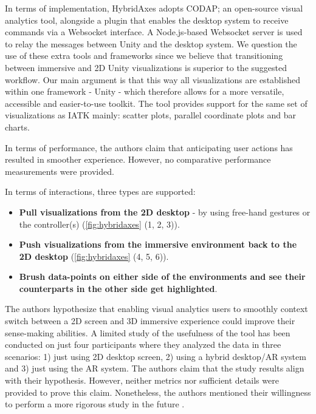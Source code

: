 \documentclass{vgtc}                          %
\begin{document}
\medskip

\noindent In terms of implementation, HybridAxes adopts CODAP; an open-source
\cite{codap} visual analytics tool, alongside a plugin
that enables the desktop system to receive commands via a Websocket interface.
A Node.js-based Websocket server is used to relay the messages between Unity
and the desktop system. We question the use of these extra tools and frameworks
since we believe that transitioning between immersive and 2D Unity
visualizations is superior to the suggested workflow. Our main argument is
that this way all visualizations are established within one framework - Unity -
which therefore allows for a more versatile, accessible and easier-to-use
toolkit. The tool provides support for the same set of visualizations as IATK
mainly: scatter plots, parallel coordinate plots and bar charts.

\medskip

\noindent In terms of performance, the authors claim that anticipating user actions has resulted in smoother
experience. However, no comparative performance measurements were provided.

\smallskip

\noindent In terms of interactions, three types are supported:
\begin{itemize}
	\item \textbf{Pull visualizations from the 2D desktop} - by using free-hand gestures
	      or the controller(s) (\autoref{fig:hybridaxes} (1, 2, 3)).
	\item \textbf{Push visualizations from the immersive environment back to the 2D
		      desktop} (\autoref{fig:hybridaxes} (4, 5, 6)).
	\item \textbf{Brush data-points on either side of the environments and see their
		      counterparts in the other side get highlighted}.
\end{itemize}


\noindent The authors hypothesize that enabling visual analytics users to
smoothly context switch between a 2D screen and 3D immersive experience could
improve their sense-making abilities. A limited study of the usefulness of the
tool has been conducted on just four participants where they analyzed the data
in three scenarios: 1) just using 2D desktop screen, 2) using a hybrid
desktop/AR system and 3) just using the AR system. The authors claim that the
study results align with their hypothesis. However, neither metrics nor
sufficient details were provided to prove this claim. Nonetheless, the authors
mentioned their willingness to perform a more rigorous study in the future \cite{xvcollab}.
\end{document}
